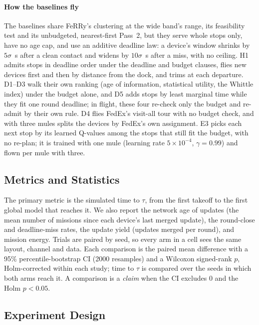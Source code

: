 \documentclass[conference]{IEEEtran}
\newcommand{\sysname}{FeRRy}
\begin{document}
\paragraph{How the baselines fly}
The baselines share \sysname{}'s clustering at the wide band's range, its
feasibility test and its unbudgeted, nearest-first Pass~2, but they serve whole
stops only, have no age cap, and use an additive deadline law: a device's window
shrinks by $5\sigma$~s after a clean contact and widens by $10\sigma$~s after a
miss, with no ceiling. H1 admits stops in deadline order under the deadline and
budget clauses, flies new devices first and then by distance from the dock, and
trims at each departure. D1--D3 walk their own ranking (age of information,
statistical utility, the Whittle index) under the budget alone, and D5 adds
stops by least marginal time while they fit one round deadline; in flight, these
four re-check only the budget and re-admit by their own rule. D4 flies FedEx's
visit-all tour with no budget check, and with three mules splits the devices by
FedEx's own assignment. E3 picks each next stop by its learned Q-values among the
stops that still fit the budget, with no re-plan; it is trained with one mule
(learning rate $5\times10^{-4}$, $\gamma=0.99$) and flown per mule with three.

\subsection{Metrics and Statistics}
\label{sec:setup:metrics}

The primary metric is the simulated time to $\tau$, from the first takeoff to the
first global model that reaches it. We also report the network age of updates
(the mean number of missions since each device's last merged update), the
round-close and deadline-miss rates, the update yield (updates merged per
round), and mission energy. Trials are paired by seed, so every arm in a cell
sees the same layout, channel and data. Each comparison is the paired mean
difference with a 95\% percentile-bootstrap CI (2000 resamples) and a Wilcoxon
signed-rank $p$, Holm-corrected within each study; time to $\tau$ is compared
over the seeds in which both arms reach it. A comparison is a \emph{claim} when
the CI excludes 0 and the Holm $p<0.05$.

\subsection{Experiment Design}
\label{sec:setup:design}
\end{document}
